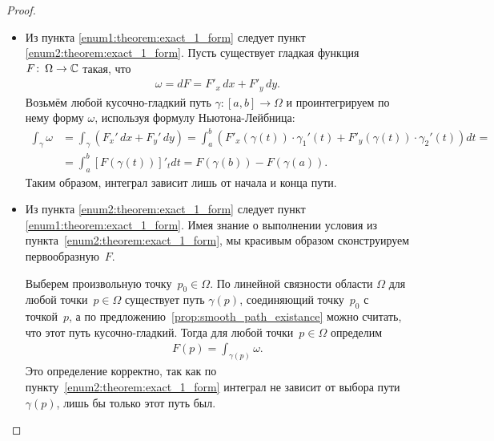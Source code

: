 \documentclass[../complex-analysis.tex]{subfiles}
\begin{document}
\begin{proof}\
 \begin{itemize}
  \item Из пункта \ref{enum1:theorem:exact_1_form} следует пункт \ref{enum2:theorem:exact_1_form}. Пусть существует гладкая функция $F \colon\,\Omega \to \mathbb{C}$ такая, что
   \begin{align*}
    \omega = d F = F'_x \, dx + F'_y \, dy
   .\end{align*} Возьмём любой кусочно-гладкий путь $\gamma \colon [a,b] \to \Omega$ и проинтегрируем по нему форму $\omega$, используя формулу Ньютона-Лейбница:
   \begin{align*}
    \int_{\gamma} \omega &= \int_{\gamma} \left( F_x'\,dx + F_y'\,dy \right) = \int_{a}^{b} \left( F'_x(\gamma(t)) \cdot \gamma_1'(t)  + F'_y(\gamma(t)) \cdot\gamma_2'(t) \right) dt = \\
    &= \int_{a}^{b} \left[ F(\gamma(t)) \right]'_t dt = F(\gamma(b)) - F(\gamma(a))
   .\end{align*} Таким образом, интеграл зависит лишь от начала и конца пути.

  \item Из пункта \ref{enum2:theorem:exact_1_form} следует пункт \ref{enum1:theorem:exact_1_form}. Имея знание о выполнении условия из пункта~\ref{enum2:theorem:exact_1_form}, мы красивым образом сконструируем первообразную~$F$.

   Выберем произвольную точку~$p_0 \in \Omega$. По линейной связности области $ \Omega $ для любой точки~$ p \in \Omega $ существует путь $ \gamma(p) $, соединяющий точку~$ p_0 $ с точкой~$ p $, а по предложению~\ref{prop:smooth_path_existance} можно считать, что этот путь кусочно-гладкий. Тогда для любой точки~$ p \in \Omega $ определим
   \begin{align*}
    F(p) = \int_{\gamma(p)}  \omega.
   \end{align*} Это определение корректно, так как по пункту~\ref{enum2:theorem:exact_1_form} интеграл не зависит от выбора пути~$ \gamma(p) $, лишь бы только этот путь был.


\end{itemize}
\end{proof}
\end{document}
